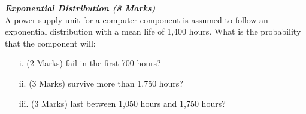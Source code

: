 

\item[(b)] \textbf{\textit{Exponential Distribution (8 Marks)}}\\ %
A power supply unit for a computer component is assumed to follow an exponential distribution with a mean life of 1,400 hours.  What is the probability that the component will:
\begin{itemize}
\item [i.](2 Marks)	fail in the first 700 hours?
\item [ii.](3 Marks) survive more than 1,750 hours?
\item [iii.](3 Marks) last between 1,050 hours and 1,750 hours?
\end{itemize}

